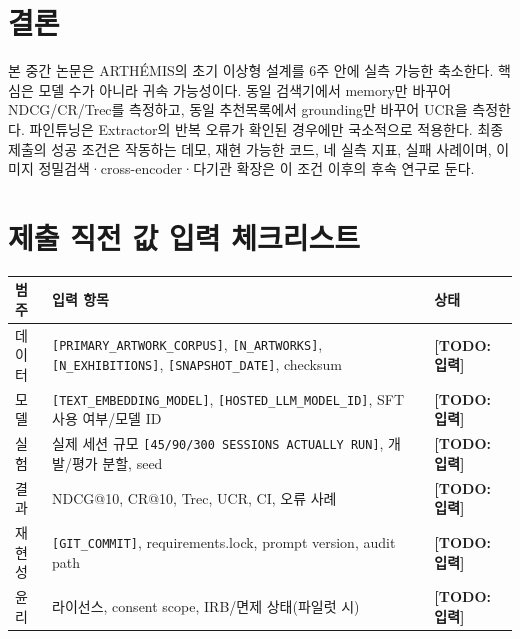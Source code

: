 \documentclass[10pt,a4paper,twocolumn]{article}
\newcommand{\ProjectName}{ARTHÉMIS-Core}
\newcommand{\CorpusName}{\texttt{[PRIMARY\_ARTWORK\_CORPUS]}}
\newcommand{\ArtworkN}{\texttt{[N\_ARTWORKS]}}
\newcommand{\ExhibitionN}{\texttt{[N\_EXHIBITIONS]}}
\newcommand{\SnapshotDate}{\texttt{[SNAPSHOT\_DATE]}}
\newcommand{\EmbeddingModel}{\texttt{[TEXT\_EMBEDDING\_MODEL]}}
\newcommand{\HostedLLM}{\texttt{[HOSTED\_LLM\_MODEL\_ID]}}
\newcommand{\EvalScale}{\texttt{[45/90/300\ SESSIONS\ ACTUALLY\ RUN]}}
\newcommand{\GitCommit}{\texttt{[GIT\_COMMIT]}}
\newcommand{\TODO}[1]{\textcolor{Warn}{\textbf{[TODO: #1]}}}
\begin{document}
\section{결론}
본 중간 논문은 ARTHÉMIS의 초기 이상형 설계를 6주 안에 실측 가능한  축소한다. 핵심은 모델 수가 아니라 귀속 가능성이다. 동일 검색기에서 memory만 바꾸어 NDCG/CR/Trec를 측정하고, 동일 추천목록에서 grounding만 바꾸어 UCR을 측정한다. 파인튜닝은 Extractor의 반복 오류가 확인된 경우에만 국소적으로 적용한다. 최종 제출의 성공 조건은 작동하는 데모, 재현 가능한 코드, 네 실측 지표, 실패 사례이며, 이미지 정밀검색·cross-encoder·다기관 확장은 이 조건 이후의 후속 연구로 둔다.

\appendix
\section{제출 직전 값 입력 체크리스트}
\begin{table}[H]
\centering
\small
\begin{tabularx}{0.97\textwidth}{@{}p{}X p{}@{}}
\toprule
범주 & 입력 항목 & 상태 \\
\midrule
데이터 & \CorpusName, \ArtworkN, \ExhibitionN, \SnapshotDate, checksum & \TODO{입력} \\
모델 & \EmbeddingModel, \HostedLLM, SFT 사용 여부/모델 ID & \TODO{입력} \\
실험 & 실제 세션 규모 \EvalScale, 개발/평가 분할, seed & \TODO{입력} \\
결과 & NDCG@10, CR@10, Trec, UCR, CI, 오류 사례 & \TODO{입력} \\
재현성 & \GitCommit, requirements.lock, prompt version, audit path & \TODO{입력} \\
윤리 & 라이선스, consent scope, IRB/면제 상태(파일럿 시) & \TODO{입력} \\
\bottomrule
\end{tabularx}
\end{table}
\end{document}
